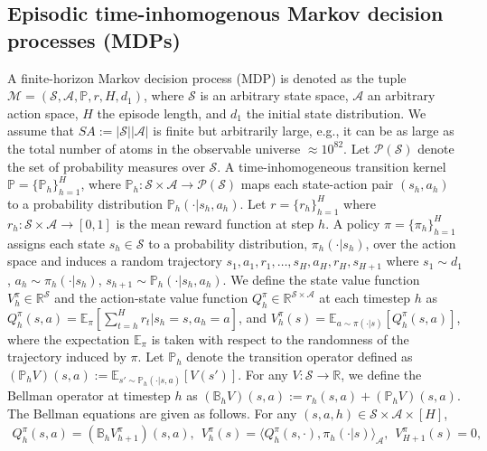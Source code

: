 \documentclass{article} \usepackage{iclr2023/iclr2023_conference,times}
\begin{document}
\subsection{Episodic time-inhomogenous Markov decision processes (MDPs)}
A finite-horizon Markov decision process (MDP) is denoted as the tuple $\mathcal{M} = (\mathcal{S}, \mathcal{A}, \mathbb{P},r, H, d_1)$, where $\mathcal{S}$ is an arbitrary state space, $\mathcal{A}$ an arbitrary action space, $H$ the episode length, and $d_1$ the initial state distribution. We assume that $S A := | \mathcal{S}| |\mathcal{A} |$ is finite but arbitrarily large, e.g.,  it can be as large as the total number of atoms in the observable universe $\approx 10^{82}$. Let $\mathcal{P}(\mathcal{S})$ denote the set of probability measures over $\mathcal{S}$. A time-inhomogeneous transition kernel $\mathbb{P} = \{\mathbb{P}_h\}_{h=1}^H$, where $\mathbb{P}_h: \mathcal{S} \times \mathcal{A} \rightarrow \mathcal{P}(\mathcal{S})$ maps each state-action pair $(s_h, a_h)$ to a probability distribution $\mathbb{P}_h(\cdot|s_h, a_h)$. Let $r = \{r_h\}_{h=1}^H$ where $r_h: \mathcal{S} \times \mathcal{A} \rightarrow [0,1]$ is the mean reward function at step $h$. A policy $\pi = \{\pi_h\}_{h=1}^H$ assigns each state $s_h \in \mathcal{S}$ to a probability distribution, $\pi_h(\cdot|s_h)$, over the action space  and induces a random trajectory $s_1, a_1, r_1, \ldots, s_H, a_H, r_H, s_{H+1}$ where $s_1 \sim d_1$, $a_h \sim \pi_h(\cdot|s_h)$, $s_{h+1} \sim \mathbb{P}_h(\cdot | s_h, a_h)$. We define the state value function $V^{\pi}_h \in \mathbb{R}^{\mathcal{S}}$ and the action-state value function $Q^{\pi}_h \in \mathbb{R}^{\mathcal{S} \times \mathcal{A}}$ at each timestep $h$ as 
$Q^{\pi}_h(s,a) = \mathbb{E}_{\pi} [\sum_{t=h}^H r_t | s_h=s, a_h=a ]$, and $
    V^{\pi}_h(s) = \mathbb{E}_{a \sim \pi(\cdot |s)} \left[Q^{\pi}_h(s,a) \right]$,
where the expectation $\mathbb{E}_{\pi}$ is taken with respect to the randomness of the trajectory induced by $\pi$. Let $\mathbb{P}_h$ denote the transition operator defined as $(\mathbb{P}_h V)(s,a) := \mathbb{E}_{s' \sim \mathbb{P}_h(\cdot| s,a)} [V(s')]$. For any $V: \mathcal{S} \rightarrow \mathbb{R}$, we define the Bellman operator at timestep $h$ as $(\mathbb{B}_h V)(s,a) := r_h(s,a) + (\mathbb{P}_h V)(s,a)$. The Bellman equations are given as follows. For any $(s,a,h) \in \mathcal{S} \times \mathcal{A} \times [H]$,
\begin{align*}
    Q^{\pi}_h(s,a) = (\mathbb{B}_h V^{\pi}_{h+1})(s,a), \hspace{5pt} V^{\pi}_h(s) = \langle Q^{\pi}_h(s, \cdot), \pi_h(\cdot|s) \rangle_{\mathcal{A}}, \hspace{5pt} V^{\pi}_{H+1}(s) = 0,
\end{align*}
\end{document}
